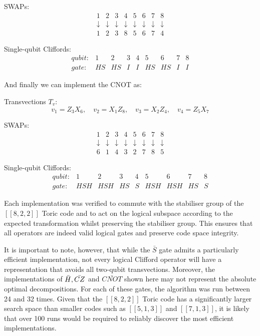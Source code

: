 SWAPs:
\[
\begin{array}{cccccccc}
1 & 2 & 3 & 4 & 5 & 6 & 7 & 8 \\
\downarrow & \downarrow & \downarrow & \downarrow & \downarrow & \downarrow & \downarrow & \downarrow \\
1 & 2 & 3 & 8 & 5 & 6 & 7 & 4
\end{array}
\]

Single-qubit Cliffords:
\[
\begin{array}{ccccccccc}
qubit: & 1 & 2 & 3 & 4 & 5 & 6 & 7 & 8 \\
gate: & HS & HS & I & I & HS & HS & I & I
\end{array}
\]

And finally we can implement the CNOT as:

Transvections \(T_v\):
\begin{equation}
    v_1 = Z_3X_6, \quad v_2=X_1Z_8, \quad v_3=X_2Z_4, \quad v_4=Z_5X_7
\end{equation}

SWAPs:
\[
\begin{array}{cccccccc}
1 & 2 & 3 & 4 & 5 & 6 & 7 & 8 \\
\downarrow & \downarrow & \downarrow & \downarrow & \downarrow & \downarrow & \downarrow & \downarrow \\
6 & 1 & 4 & 3 & 2 & 7 & 8 & 5
\end{array}
\]

Single-qubit Cliffords:
\[
\begin{array}{ccccccccc}
qubit: & 1 & 2 & 3 & 4 & 5 & 6 & 7 & 8 \\
gate: & HSH & HSH & HS & S & HSH & HSH & HS & S
\end{array}
\]

Each implementation was verified to commute with the stabiliser group of the \([[8,2,2]] \) Toric code and to act on the logical subspace according to the expected transformation whilst preserving the stabiliser group. This ensures that all operators are indeed valid logical gates and preserve code space integrity.

It is important to note, however, that while the \(\bar{S}\) gate admits a particularly efficient implementation, not every logical Clifford operator will have a representation that avoids all two-qubit transvections. Moreover, the implementations of \(\bar{H},\space \bar{CZ}\) and \(\bar{CNOT}\) shown here may not represent the absolute optimal decompositions. For each of these gates, the algorithm was run between 24 and 32 times. Given that the 
\([[8,2,2]]\) Toric code has a significantly larger search space than smaller codes such as \([[5,1,3]]\) and \([[7,1,3]]\), it is likely that over 100 runs would be required to reliably discover the most efficient implementations.

